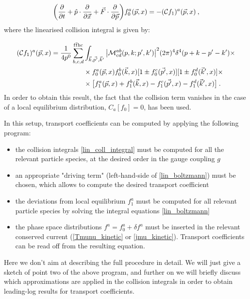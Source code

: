 \begin{equation}
\biggl( \frac{\partial  }{\partial t}+ \hat p \cdot \frac{\partial  }{\partial \vec x} + \vec F \cdot \frac{\partial  }{\partial \vec p} \biggr) f^a_0(\vec p,x)  =
- (\mathcal Cf_1)^a (\vec p, x) \: ,
\label{lin_boltzmann}
\end{equation}
%
where the linearised collision integral is given by:

\begin{equation}
\begin{split}
(\mathcal Cf_1)^a (\vec p, x) =  \frac{1}{4 p^0} \sum_{b,c,d}^{\mathrm{f \bar f h c}} &\int_{\vec k, \vec{p'}, \vec k'}  \abs{\mathcal M^{ab}_{cd}(p,k;p',k')}^2 (2 \pi)^4 \delta^4(p+k-p'-k') \times \\
&\times f_0^a(\vec p,x) f_0^b(\vec k,x)[1 \pm f_0^c(\vec{p'},x)][1 \pm f_0^d(\vec k', x)] \times \\
& \times \bigl[f_1^a(\vec p,x) + f_1^b(\vec k,x) - f_1^c(\vec{p'},x) - f_1^d(\vec k',x)\bigr] \: .
\end{split}
\label{lin_coll_integral}
\end{equation}
%
In order to obtain this result, the fact that the collision term vanishes in the case of a local equilibrium distribution, $C_a[f_0] = 0$, has been used.

In this setup, transport coefficients can be computed by applying the following program:

\begin{itemize}
\item the collision integrals \ref{lin_coll_integral} must be computed for all the relevant particle species, at the desired order in the gauge coupling $g$
\item an appropriate "driving term" (left-hand-side of \ref{lin_boltzmann}) must be chosen, which allows to compute the desired transport coefficient
\item the deviations from local equilibrium $f_1^a$ must be computed for all relevant particle species by solving the integral equations \ref{lin_boltzmann}
\item the phase space distributions $f^a = f^a_0 + \delta f^a$ must be inserted in the relevant conserved current (\ref{Tmunu_kinetic} or \ref{jmu_kinetic}). Transport coefficients can be read off from the resulting equation.
\end{itemize}
%
Here we don't aim at describing the full procedure in detail. We will just give a sketch of point two of the above program, and further on we will briefly discuss which approximations are applied in the collision integrals in order to obtain leading-log results for transport coefficients.

